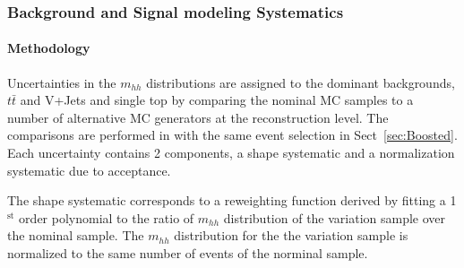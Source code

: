 \FloatBarrier
 
\subsubsection{Background and Signal modeling Systematics}
\label{sec:boosted_syst_modeling}
 
 
\paragraph{Methodology}
\label{sec:boosted_syst_modeling_method}
 
Uncertainties in the $m_{hh}$ distributions are assigned to the dominant backgrounds, $t\bar{t}$ and V+Jets and
single top by comparing the nominal MC samples to a number of alternative MC generators at the reconstruction
level. The comparisons are performed in with the same event selection in Sect~\ref{sec:Boosted}.
Each uncertainty contains 2 components, a shape systematic and a normalization systematic due to acceptance.
 
The shape systematic corresponds to a reweighting function derived by fitting a 1$^\text{st}$ order polynomial to the
ratio of $m_{hh}$ distribution of the variation sample over the nominal sample. The $m_{hh}$ distribution for the
the variation sample is normalized to the same number of events of the norminal sample.
 
 
 
 
